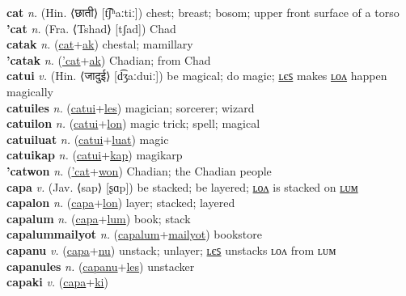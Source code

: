 \textbf{cat} \textit{n.} (Hin. ⟨छाती⟩ [t͡ʃʰaːtiː])
chest; breast; bosom; upper front surface of a torso \label{cat} \\
\textbf{'cat} \textit{n.} (Fra. ⟨Tshad⟩ [tʃad])
Chad \label{'cat} \\
\textbf{catak} \textit{n.} (\hyperref[cat]{cat}+\hyperref[ak]{ak})
chestal; mamillary \label{catak} \\
\textbf{'catak} \textit{n.} (\hyperref['cat]{'cat}+\hyperref[ak]{ak})
Chadian; from Chad \label{'catak} \\
\textbf{catui} \textit{v.} (Hin. ⟨जादुई⟩ [d͡ʒaːduiː])
be magical; do magic; \hyperref[catuiles]{ʟєꜱ} makes \hyperref[catuilon]{ʟᴏᴧ} happen magically \label{catui} \\
\textbf{catuiles} \textit{n.} (\hyperref[catui]{catui}+\hyperref[les]{les})
magician; sorcerer; wizard \label{catuiles} \\
\textbf{catuilon} \textit{n.} (\hyperref[catui]{catui}+\hyperref[lon]{lon})
magic trick; spell; magical \label{catuilon} \\
\textbf{catuiluat} \textit{n.} (\hyperref[catui]{catui}+\hyperref[luat]{luat})
magic \label{catuiluat} \\
\textbf{catuikap} \textit{n.} (\hyperref[catui]{catui}+\hyperref[kap]{kap})
magikarp \label{catuikap} \\
\textbf{'catwon} \textit{n.} (\hyperref['cat]{'cat}+\hyperref[won]{won})
Chadian; the Chadian people \label{'catwon} \\
\textbf{capa} \textit{v.} (Jav. ⟨sap⟩ [ʂɑp])
be stacked; be layered; \hyperref[capalon]{ʟᴏᴧ} is stacked on \hyperref[capalum]{ʟᴜᴍ} \label{capa} \\
\textbf{capalon} \textit{n.} (\hyperref[capa]{capa}+\hyperref[lon]{lon})
layer; stacked; layered \label{capalon} \\
\textbf{capalum} \textit{n.} (\hyperref[capa]{capa}+\hyperref[lum]{lum})
book; stack \label{capalum} \\
\textbf{capalummailyot} \textit{n.} (\hyperref[capalum]{capalum}+\hyperref[mailyot]{mailyot})
bookstore \label{capalummailyot} \\
\textbf{capanu} \textit{v.} (\hyperref[capa]{capa}+\hyperref[nu]{nu})
unstack; unlayer; \hyperref[capanules]{ʟєꜱ} unstacks ʟᴏᴧ from ʟᴜᴍ \label{capanu} \\
\textbf{capanules} \textit{n.} (\hyperref[capanu]{capanu}+\hyperref[les]{les})
unstacker \label{capanules} \\
\textbf{capaki} \textit{v.} (\hyperref[capa]{capa}+\hyperref[ki]{ki})
